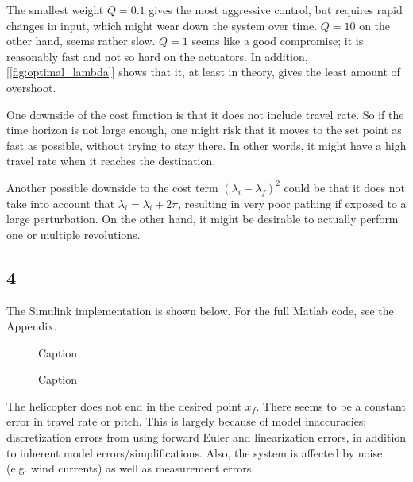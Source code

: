 The smallest weight $Q=0.1$ gives the most aggressive control, but requires rapid changes in input, which might wear down the system over time. $Q=10$ on the other hand, seems rather slow. $Q=1$ seems like a good compromise; it is reasonably fast and not so hard on the actuators. In addition, [\ref{fig:optimal_lambda}] shows that it, at least in theory, gives the least amount of overshoot.

One downside of the cost function is that it does not include travel rate. So if the time horizon is not large enough, one might risk that it moves to the set point as fast as possible, without trying to stay there. In other words, it might have a high travel rate when it reaches the destination.

Another possible downside to the cost term $(\lambda_i - \lambda_f)^2$ could be that it does not take into account that $\lambda_i = \lambda_ i + 2\pi$, resulting in very poor pathing if exposed to a large perturbation. On the other hand, it might be desirable to actually perform one or multiple revolutions.
\clearpage

\subsection{4}
The Simulink implementation is shown below. For the full Matlab code, see the Appendix.
\begin{figure}[H]
    \centering
    \caption{Caption}
    \label{fig:my_label}
\end{figure}

\begin{figure}
    \centering
    \caption{Caption}
    \label{fig:my_label}
\end{figure}

The helicopter does not end in the desired point $x_f$. There seems to be a constant error in travel rate or pitch. This is largely  because of model inaccuracies; discretization errors from using forward Euler and linearization errors, in addition to inherent model errors/simplifications. Also, the system is affected by noise (e.g. wind currents) as well as measurement errors.


